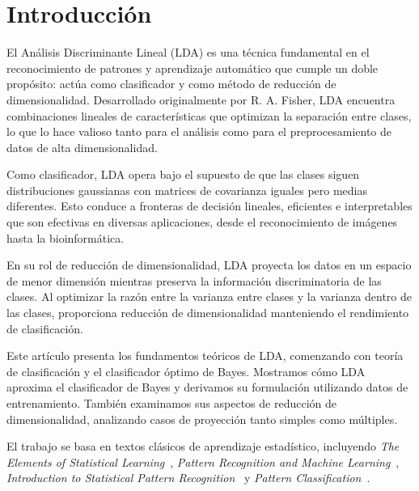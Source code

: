 \section{Introducción}

El Análisis Discriminante Lineal (LDA) es una técnica fundamental en el reconocimiento de patrones y aprendizaje automático que cumple un doble propósito: actúa como clasificador y como método de reducción de dimensionalidad. Desarrollado originalmente por R. A. Fisher, LDA encuentra combinaciones lineales de características que optimizan la separación entre clases, lo que lo hace valioso tanto para el análisis como para el preprocesamiento de datos de alta dimensionalidad.

Como clasificador, LDA opera bajo el supuesto de que las clases siguen distribuciones gaussianas con matrices de covarianza iguales pero medias diferentes. Esto conduce a fronteras de decisión lineales, eficientes e interpretables que son efectivas en diversas aplicaciones, desde el reconocimiento de imágenes hasta la bioinformática.

En su rol de reducción de dimensionalidad, LDA proyecta los datos en un espacio de menor dimensión mientras preserva la información discriminatoria de las clases. Al optimizar la razón entre la varianza entre clases y la varianza dentro de las clases, proporciona reducción de dimensionalidad manteniendo el rendimiento de clasificación.

Este artículo presenta los fundamentos teóricos de LDA, comenzando con teoría de clasificación y el clasificador óptimo de Bayes. Mostramos cómo LDA aproxima el clasificador de Bayes y derivamos su formulación utilizando datos de entrenamiento. También examinamos sus aspectos de reducción de dimensionalidad, analizando casos de proyección tanto simples como múltiples.

El trabajo se basa en textos clásicos de aprendizaje estadístico, incluyendo \emph{The Elements of Statistical Learning}~\cite{hastie2009elements}, \emph{Pattern Recognition and Machine Learning}~\cite{bishop2006pattern}, \emph{Introduction to Statistical Pattern Recognition}~\cite{fukunaga1990introduction} y \emph{Pattern Classification}~\cite{duda2012pattern}.

